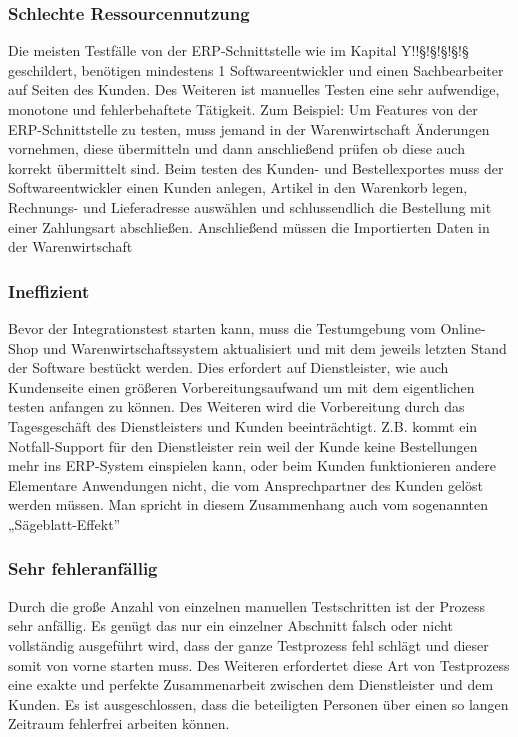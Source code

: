 \subsubsection{Schlechte Ressourcennutzung}
Die meisten Testfälle von der ERP-Schnittstelle wie im Kapital Y!!§!§!§!§!§ geschildert, benötigen mindestens 1 Softwareentwickler und einen Sachbearbeiter auf Seiten des Kunden. Des Weiteren ist manuelles Testen eine sehr aufwendige, monotone und fehlerbehaftete
Tätigkeit. Zum Beispiel: Um Features von der ERP-Schnittstelle zu testen, muss jemand in der Warenwirtschaft Änderungen vornehmen, diese übermitteln und dann anschließend prüfen ob diese auch korrekt übermittelt sind. Beim testen des Kunden- und Bestellexportes muss der Softwareentwickler einen Kunden anlegen, Artikel in den Warenkorb legen, Rechnungs- und Lieferadresse auswählen und schlussendlich die Bestellung mit einer Zahlungsart abschließen. Anschließend müssen die Importierten Daten in der Warenwirtschaft 	 

\subsubsection{Ineffizient}
Bevor der Integrationstest starten kann, muss die Testumgebung vom Online-Shop und Warenwirtschaftssystem aktualisiert und mit dem jeweils letzten Stand der Software bestückt werden. Dies erfordert auf Dienstleister, wie auch Kundenseite einen größeren 
Vorbereitungsaufwand um mit dem eigentlichen testen anfangen zu können. Des Weiteren wird die Vorbereitung durch das Tagesgeschäft des Dienstleisters und Kunden beeinträchtigt. Z.B. kommt ein Notfall-Support für den Dienstleister rein weil der Kunde keine Bestellungen mehr ins ERP-System einspielen kann, oder beim Kunden funktionieren andere Elementare Anwendungen nicht, die vom Ansprechpartner des Kunden gelöst werden müssen. Man spricht in diesem Zusammenhang auch vom sogenannten „Sägeblatt-Effekt”


\subsubsection{Sehr fehleranfällig}
Durch die große Anzahl von einzelnen manuellen Testschritten ist der Prozess sehr anfällig. Es genügt das nur ein einzelner Abschnitt falsch oder nicht vollständig ausgeführt wird, dass der ganze Testprozess fehl schlägt und dieser somit von vorne starten muss. Des Weiteren erfordertet diese Art von Testprozess eine exakte und perfekte Zusammenarbeit zwischen dem Dienstleister und dem Kunden. Es ist ausgeschlossen, dass die beteiligten Personen über einen so langen Zeitraum fehlerfrei arbeiten können.

